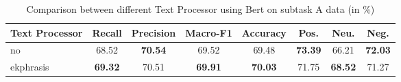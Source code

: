 \begin{table*}[htbp!] %
    \centering
    \begin{tabular}{lccccccc}
    \midrule
    Text Processor          & Recall         & Precision       & Macro-F1        & Accuracy & Pos. &Neu. & Neg.\\
    \midrule
    no              & 68.52 & \bf70.54 & 69.52    & 69.48 & \bf73.39    & 66.21 & \bf72.03 \\
    ekphrasis    & \bf69.32 & 70.51 & \bf69.91 & \bf70.03    & 71.75 & \bf68.52 & 71.27    \\
    \bottomrule
    \end{tabular}
\caption{Comparison between different Text Processor using Bert on subtask A data (in \%)}
\label{tab:bert}
\end{table*}
